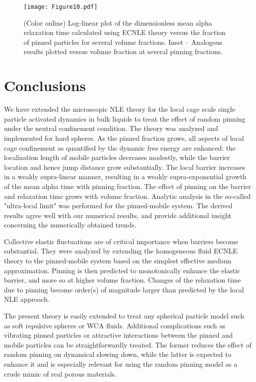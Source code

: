\documentclass[twocolumn,showpacs,preprintnumbers,amsmath,amssymb,unsortedaddress,
]{revtex4-1}
\begin{document}
\begin{figure}[htp]
\center
\texttt{[image: Figure10.pdf]}
\caption{\label{fig:10}(Color online) Log-linear plot of the dimensionless mean alpha relaxation time calculated using ECNLE theory versus the fraction of pinned particles for several volume fractions. Inset – Analogous results plotted versus volume fraction at several pinning fractions.
}
\end{figure}

\section{Conclusions}
We have extended the microscopic NLE theory for the local cage scale single particle activated dynamics in bulk liquids to treat the effect of random pinning under the neutral confinement condition. The theory was analyzed and implemented for hard spheres. As the pinned fraction grows, all aspects of local cage confinement as quantified by the dynamic free energy are enhanced: the localization length of mobile particles decreases modestly, while the barrier location and hence jump distance grow substantially. The local barrier increases in a weakly supra-linear manner, resulting in a weakly supra-exponential growth of the mean alpha time with pinning fraction. The effect of pinning on the barrier and relaxation time grows with volume fraction. Analytic analysis in the so-called "ultra-local limit" was performed for the pinned-mobile system. The derived results agree well with our numerical results, and provide additional insight concerning the numerically obtained trends.

Collective elastic fluctuations are of critical importance when barriers become substantial. They were analyzed by extending the homogeneous fluid ECNLE theory to the pinned-mobile system based on the simplest effective medium approximation. Pinning is then predicted to monotonically enhance the elastic barrier, and more so at higher volume fraction. Changes of the relaxation time due to pinning become order(s) of magnitude larger than predicted by the local NLE approach.

The present theory is easily extended to treat any spherical particle model such as soft repulsive spheres or WCA fluids. Additional complications such as vibrating pinned particles or attractive interactions between the pinned and mobile particles can be straightforwardly treated. The former reduces the effect of random pinning on dynamical slowing down, while the latter is expected to enhance it and is especially relevant for using the random pinning model as a crude mimic of real porous materials.
\end{document}
